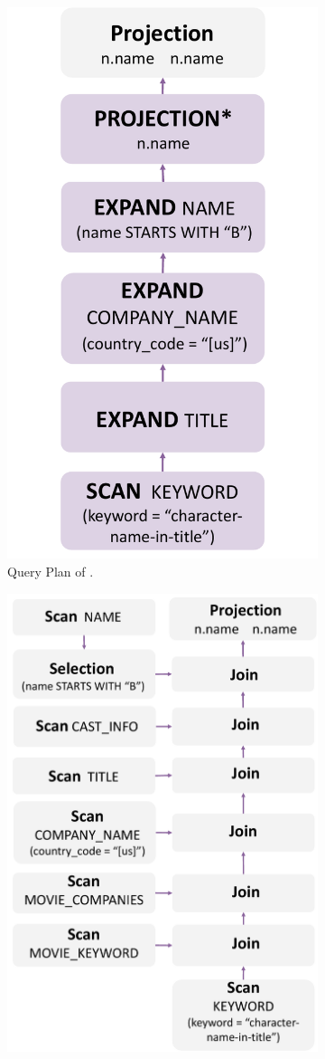 \begin{figure}[ht]
    \centering
    \begin{subfigure}[b]{.3\linewidth}
        \centering
        \includegraphics[width=.5\linewidth]{./figures/job17a-plan-gopt.pdf}
        \caption{Query Plan of \name.}
        \label{fig:job17a-plan-relgo}
    \end{subfigure}
    \begin{subfigure}[b]{.25\linewidth}
        \centering
        \includegraphics[width=.85\linewidth]{./figures/job17a-plan-graindb.pdf}

\end{subfigure}
\end{figure}
